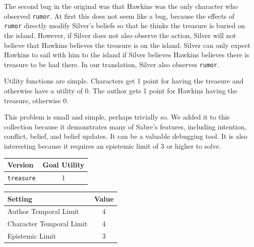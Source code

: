 \documentclass{nilreport}
\begin{document}
The second bug in the original was that Hawkins was the only character
who observed \texttt{rumor}. At first this does not seem like a bug,
because the effects of \texttt{rumor} directly modify Silver's beliefs
so that he thinks the treasure is buried on the island. However, if
Silver does not also observe the action, Silver will not believe that
Hawkins believes the treasure is on the island. Silver can only expect
Hawkins to sail with him to the island if Silver believes Hawkins
believes there is treasure to be had there. In our translation, Silver
also observes \texttt{rumor}.

Utility functions are simple. Characters get 1 point for having the
treasure and otherwise have a utility of 0. The author gets 1 point
for Hawkins having the treasure, otherwise 0.

This problem is small and simple, perhaps trivially so. We added it
to this collection because it demonstrates many of Sabre's features,
including intention, conflict, belief, and belief updates. It can
be a valuable debugging tool. It is also interesting because it requires
an epistemic limit of 3 or higher to solve.

\medskip{}
\noindent{}

\medskip{}

\begin{center}
\begin{tabular}[t]{|l|c|}
\hline 
\textbf{Version} & \textbf{Goal Utility}\tabularnewline
\hline 
\hline 
\texttt{treasure} & 1\tabularnewline
\hline 
\end{tabular}\textbf{\quad{}}%
\begin{tabular}[t]{|l|c|}
\hline 
\textbf{Setting} & \textbf{Value}\tabularnewline
\hline 
\hline 
Author Temporal Limit & 4\tabularnewline
\hline 
Character Temporal Limit & 4\tabularnewline
\hline 
Epistemic Limit & 3\tabularnewline
\hline 
\end{tabular}
\par\end{center}
\end{document}
